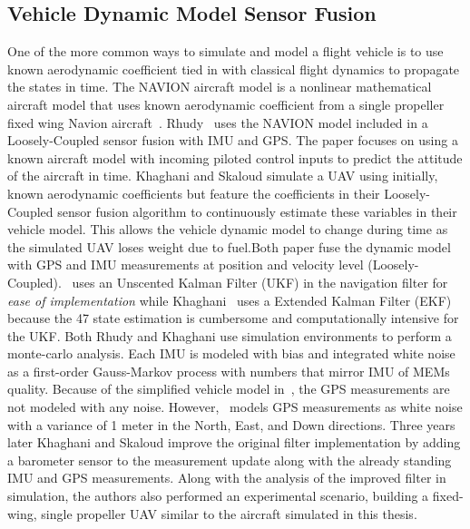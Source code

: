 \subsection{Vehicle Dynamic Model Sensor Fusion}
One of the more common ways to simulate and model a flight vehicle is to use known aerodynamic coefficient tied in with classical flight dynamics to propagate the states in time. The NAVION aircraft model is a nonlinear mathematical aircraft model that uses known aerodynamic coefficient from a single propeller fixed wing Navion aircraft~\cite{nelsonFlightStabilityAutomatic1998}. Rhudy~\cite{rhudyDynamicModelaidedSensor2017} uses the NAVION model included in a Loosely-Coupled sensor fusion with IMU and GPS\@. The paper focuses on using a known aircraft model with incoming piloted control inputs to predict the attitude of the aircraft in time. Khaghani and Skaloud simulate a UAV using initially, known aerodynamic coefficients but feature the coefficients in their Loosely-Coupled sensor fusion algorithm to continuously estimate these variables in their vehicle model. This allows the vehicle dynamic model to change during time as the simulated UAV loses weight due to fuel.Both paper fuse the dynamic model with GPS and IMU measurements at position and velocity level (Loosely-Coupled).~\cite{rhudyDynamicModelaidedSensor2017} uses an Unscented Kalman Filter (UKF) in the navigation filter for \textit{ease of implementation} while Khaghani~\cite{khaghaniAutonomousVehicleDynamic2016,khaghaniAssessmentVDMbasedAutonomous2018} uses a Extended Kalman Filter (EKF) because the 47 state estimation is cumbersome and computationally intensive for the UKF\@. Both Rhudy and Khaghani use simulation environments to perform a monte-carlo analysis. Each IMU is modeled with bias and integrated white noise as a first-order Gauss-Markov process with numbers that mirror IMU of MEMs quality. Because of the simplified vehicle model in~\cite{rhudyDynamicModelaidedSensor2017}, the GPS measurements are not modeled with any noise. However,~\cite{khaghaniAutonomousVehicleDynamic2016} models GPS measurements as white noise with a variance of 1 meter in the North, East, and Down directions. Three years later Khaghani and Skaloud improve the original filter implementation by adding a barometer sensor to the measurement update along with the already standing IMU and GPS measurements. Along with the analysis of the improved filter in simulation, the authors also performed an experimental scenario, building a fixed-wing, single propeller UAV similar to the aircraft simulated in this thesis.

